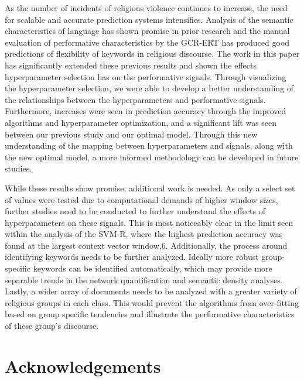 \documentclass[11pt, a4paper]{article}
\begin{document}
As the number of incidents of religious violence continues to increase, the need for scalable and accurate prediction systems intensifies. Analysis of the semantic characteristics of language has shown promise in prior research and the manual evaluation of performative characteristics by the GCR-ERT has produced good predictions of flexibility of keywords in religious discourse. The work in this paper has significantly extended these previous results and shown the effects hyperparameter selection has on the performative signals. Through visualizing the hyperparameter selection, we were able to develop a better understanding of the relationships between the hyperparameters and performative signals. Furthermore, increases were seen in prediction accuracy through the improved algorithms and hyperparameter optimization, and a significant lift was seen between our previous study and our optimal model. Through this new understanding of the mapping between hyperparameters and signals, along with the new optimal model, a more informed methodology can be developed in future studies. 

While these results show promise, additional work is needed. As only a select set of values were tested due to computational demands of higher window sizes, further studies need to be conducted to further understand the effects of hyperparameters on these signals. This is most noticeably clear in the limit seen within the analysis of the SVM-R, where the highest prediction accuracy was found at the largest context vector window,6. Additionally, the process around identifying keywords needs to be further analyzed. Ideally more robust group-specific keywords can be identified automatically, which may provide more separable trends in the network quantification and semantic density analyses. Lastly, a wider array of documents needs to be analyzed with a greater variety of religious groups in each class. This would prevent the algorithms from over-fitting based on group specific tendencies and illustrate the performative characteristics of these group's discourse.

\section*{Acknowledgements}


\newpage


\end{document}
